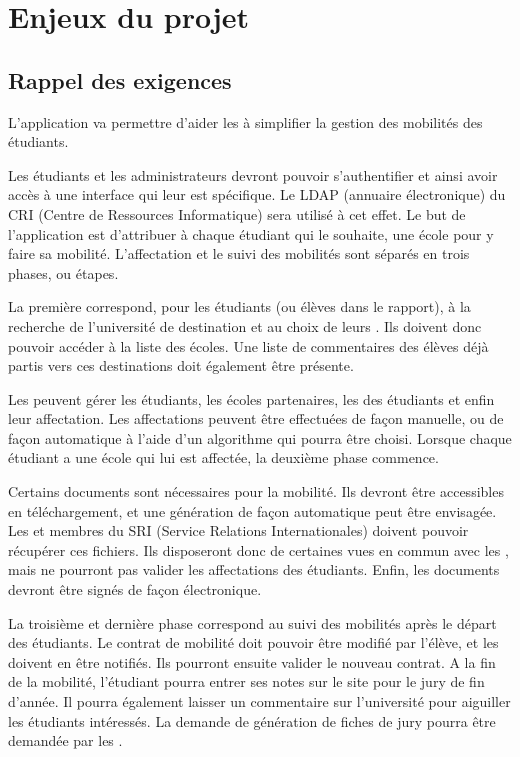 \chapter{Enjeux du projet}


\section{Rappel des exigences}

L'application va permettre d'aider les \ris à simplifier la gestion des mobilités des étudiants. 

\bigbreak

Les étudiants et les administrateurs devront pouvoir s'authentifier et ainsi avoir accès à une interface qui leur est spécifique. Le LDAP (annuaire électronique) du CRI (Centre de Ressources Informatique) sera utilisé à cet effet. Le but de l'application est d'attribuer à chaque étudiant qui le souhaite, une école pour y faire sa mobilité. L'affectation et le suivi des mobilités sont séparés en trois phases, ou étapes. 


\bigbreak

La première correspond, pour les étudiants (ou élèves dans le rapport), à la recherche de l'université de destination et au choix de leurs \voe. Ils doivent donc pouvoir accéder à la liste des écoles. Une liste de commentaires des élèves déjà partis vers ces destinations doit également être présente.

Les \ris peuvent gérer les étudiants, les écoles partenaires, les \voe des étudiants et enfin leur affectation. Les affectations peuvent être effectuées de façon manuelle, ou de façon automatique à l'aide d'un algorithme qui pourra être choisi. Lorsque chaque étudiant a une école qui lui est affectée, la deuxième phase commence.
\bigbreak

Certains documents sont nécessaires pour la mobilité. Ils devront être accessibles en téléchargement, et une génération de façon automatique peut être envisagée. Les \ris et membres du SRI (Service Relations Internationales) doivent pouvoir récupérer ces fichiers. Ils disposeront donc de certaines vues en commun avec les \ris, mais ne pourront pas valider les affectations des étudiants. Enfin, les documents devront être signés de façon électronique.

\bigbreak

La troisième et dernière phase correspond au suivi des mobilités après le départ des étudiants. Le contrat de mobilité doit pouvoir être modifié par l'élève, et les \ris doivent en être notifiés. Ils pourront ensuite valider le nouveau contrat. A la fin de la mobilité, l'étudiant pourra entrer ses notes sur le site pour le jury de fin d'année. Il pourra également laisser un commentaire sur l'université pour aiguiller les étudiants intéressés. La demande de génération de fiches de jury pourra être demandée par les \ris.


